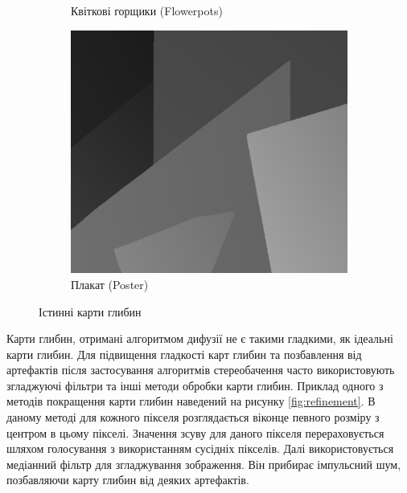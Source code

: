 \begin{figure}[h]
\begin{subfigure}[t]{0.32\textwidth}
        \caption{Квіткові горщики (Flowerpots)}
        \label{fig:flowerpots:ground:truth}
    \end{subfigure}
    \hfill
    \begin{subfigure}[t]{0.32\textwidth}
        \centering
        \includegraphics[width=\textwidth]{images/poster_ground_truth}
        \caption{Плакат (Poster)}
        \label{fig:poster:ground:truth}
    \end{subfigure}
    \caption{Істинні карти глибин}
    \label{fig:ground:truth}
\end{figure}

Карти глибин, отримані алгоритмом дифузії не є такими гладкими,
як ідеальні карти глибин.
Для підвищення гладкості карт глибин та позбавлення від артефактів
після застосування алгоритмів стереобачення
часто використовують згладжуючі фільтри та інші методи обробки карти глибин.
Приклад одного з методів покращення карти глибин \cite{refinement}
наведений на рисунку \ref{fig:refinement}.
В даному методі для кожного пікселя розглядається
віконце певного розміру з центром в цьому пікселі.
Значення зсуву для даного пікселя перераховується шляхом голосування
з використанням сусідніх пікселів.
Далі використовується медіанний фільтр для згладжування зображення.
Він прибирає імпульсний шум, позбавляючи карту глибин від деяких артефактів.

